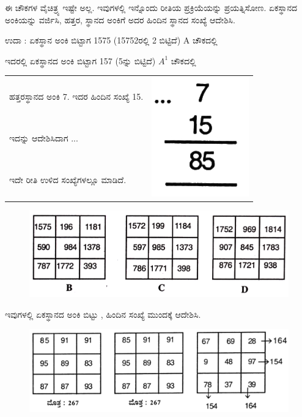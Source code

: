 ಈ ಚೌಕಗಳ ವೈಚಿತ್ರ್ಯ ಇಷ್ಟೇ ಅಲ್ಲ. ಇವುಗಳಲ್ಲಿ ಇನ್ನೊಂದು ರೀತಿಯ ಪ್ರಕ್ರಿಯೆಯನ್ನು ಪ್ರಯತ್ನಿಸೋಣ. ಏಕಸ್ಥಾನದ ಅಂಕಿಯನ್ನು ವರ್ಜಿಸಿ, ಹತ್ತರ, ಸ್ಥಾನದ ಅಂಕಿಗೆ ಅದರ ಹಿಂದಿನ ಸ್ಥಾನದ ಸಂಖ್ಯೆ ಆದೇಶಿಸಿ.

ಉದಾ : ಏಕಸ್ಥಾನ ಅಂಕಿ ಬಿಟ್ಟಾಗ 1575 (15752ರಲ್ಲಿ 2 ಬಿಟ್ಟಿದೆ) A ಚೌಕದಲ್ಲಿ

ಇದರಲ್ಲಿ ಏಕಸ್ಥಾನದ ಅಂಕಿ ಬಿಟ್ಟಾಗ 157 (5ನ್ನು ಬಿಟ್ಟಿದೆ) $A^1$ ಚೌಕದಲ್ಲಿ

\begin{tabular}{ll}
ಹತ್ತರಸ್ಥಾನದ ಅಂಕಿ 7. ಇದರ ಹಿಂದಿನ ಸಂಖ್ಯೆ 15. & \multirow{3}{2cm}{\includegraphics[scale=.8]{src/figures/chap7/fig7-33.jpg}}\\
ಇದನ್ನು ಆದೇಶಿಸಿದಾಗ ... & \\
ಇದೇ ರೀತಿ ಉಳಿದ ಸಂಖ್ಯೆಗಳಲ್ಲೂ ಮಾಡಿದೆ.
\end{tabular}

\begin{figure}[H]
\includegraphics{src/figures/chap7/fig7-13.jpg}
\end{figure}

ಇವುಗಳಲ್ಲಿ ಏಕಸ್ಥಾನದ ಅಂಕಿ ಬಿಟ್ಟು , ಹಿಂದಿನ ಸಂಖ್ಯೆ ಮುಂದಕ್ಕೆ ಆದೇಶಿಸಿ.
\begin{figure}[H]
\includegraphics{src/figures/chap7/fig7-14.jpg}
\end{figure}

